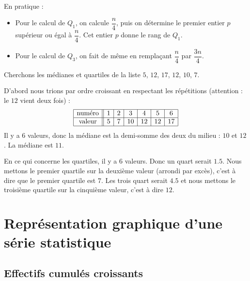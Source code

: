 \begin{center}
   
\end{center}

En pratique :
\begin{itemize}
    \item 
  Pour le calcul de $Q_1$, on calcule $\dfrac{n}4$, puis on détermine le premier entier $p$ supérieur ou égal à $\dfrac{n}4$. Cet entier $p$ donne le rang de $Q_1$. 
  \item
  Pour le calcul de $Q_3$, on fait de même en remplaçant $\dfrac{n}4$ par $\dfrac{3n}4$. 
\end{itemize}


\begin{example}
    Cherchons les médianes et quartiles de la liste $5$, $12$, $17$, $12$, $10$, $7$.

    D'abord nous trions par ordre croissant en respectant les répétitions (attention : le \( 12\) vient deux fois) : 
    \begin{equation*}
        \begin{array}[]{|c||c|c|c|c|c|c|}
            \hline
            \text{numéro}&1&2&3&4&5&6\\
            \hline
            \text{valeur}&5&7&10&12&12&17\\
            \hline
        \end{array}
    \end{equation*}
    Il y a \( 6\) valeurs, donc la médiane est la demi-somme des deux du milieu : \( 10\) et \( 12\). La médiane est \( 11\).

    En ce qui concerne les quartiles, il y a \( 6\) valeurs. Donc un quart serait \( 1.5\). Nous mettons le premier quartile sur la deuxième valeur (arrondi par excès), c'est à dire que le premier quartile est \( 7\). Les trois quart serait \( 4.5\) et nous mettons le troisième quartile sur la cinquième valeur, c'est à dire \( 12\).

\end{example}

\section{Représentation graphique d'une série statistique}

\subsection{Effectifs cumulés croissants}

